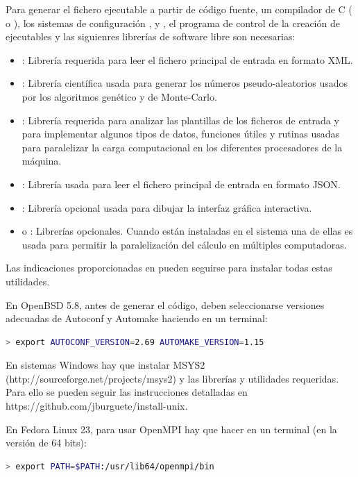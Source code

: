 \documentclass[a4paper]{report}
\begin{document}
Para generar el fichero ejecutable a partir de código fuente, un compilador de C
(\citet{gcc} o \citet{clang}), los sistemas de configuración \citet{autoconf},
\citet{automake} y \citet{pkgconfig}, el programa de control de la creación de
ejecutables \citet{gnumake} y las siguienres librerías de software libre son
necesarias:
\begin{itemize}
\item\citet{libxml}: Librería requerida para leer el fichero principal de
entrada en formato XML.
\item\citet{gsl}: Librería científica usada para generar los números
pseudo-aleatorios usados por los algoritmos genético y de Monte-Carlo.
\item\citet{glib}: Librería requerida para analizar las plantillas de los
ficheros de entrada y para implementar algunos tipos de datos, funciones útiles
y rutinas usadas para paralelizar la carga computacional en los diferentes
procesadores de la máquina.
\item\citet{json-glib}: Librería usada para leer el fichero principal de entrada
en formato JSON.
\item\citet{gtk}: Librería opcional usada para dibujar la interfaz gráfica
interactiva.
\item\citet{openmpi} o \citet{mpich}: Librerías opcionales. Cuando están
instaladas en el sistema una de ellas es usada para permitir la paralelización
del cálculo en múltiples computadoras.
\end{itemize}
Las indicaciones proporcionadas en \citet{install-unix} pueden seguirse para
instalar todas estas utilidades.

En OpenBSD 5.8, antes de generar el código, deben seleccionarse versiones
adecuadas de Autoconf y Automake haciendo en un terminal:
\begin{lstlisting}[language=bash,basicstyle=\scriptsize]
> export AUTOCONF_VERSION=2.69 AUTOMAKE_VERSION=1.15
\end{lstlisting}

En sistemas Windows hay que instalar MSYS2
(http://sourceforge.net/projects/msys2) y las librerías y utilidades requeridas.
Para ello se pueden seguir las instrucciones detalladas en
https://github.com/jburguete/install-unix.

En Fedora Linux 23, para usar OpenMPI hay que hacer en un terminal (en la
versión de 64 bits):
\begin{lstlisting}[language=bash,basicstyle=\scriptsize]
> export PATH=$PATH:/usr/lib64/openmpi/bin
\end{lstlisting}
\end{document}

